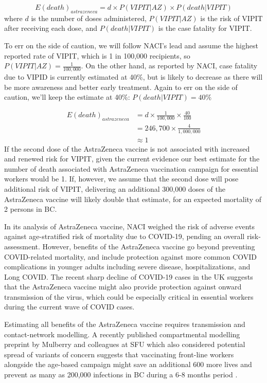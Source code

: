 \documentclass[]{interact}
\theoremstyle{plain}%
\theoremstyle{definition}
\theoremstyle{remark}
\begin{document}
\[
E(death)_{astrazeneca}  = d \times P(VIPIT|AZ) \times P(death|VIPIT)
\] where \(d\) is the number of doses administered, \(P(VIPIT|AZ)\) is
the risk of VIPIT after receiving each dose, and \(P(death|VIPIT)\) is
the case fatality for VIPIT.

To err on the side of caution, we will follow NACI's lead and assume the
highest reported rate of VIPIT, which is 1 in 100,000 recipients, so
\(P(VIPIT|AZ) = \frac{1}{100,000}\). On the other hand, as reported by
NACI, case fatality due to VIPID is currently estimated at 40\%, but is
likely to decrease as there will be more awareness and better early
treatment. Again to err on the side of caution, we'll keep the estimate
at 40\%: \(P(death|VIPIT)=40\%\)

\[
\begin{aligned}
E(death)_{astrazeneca} & = d \times \frac{1}{100,000} \times \frac{40}{100} \\
& = 246,700 \times \frac{4}{1,000,000} \\
& \approx 1  
\end{aligned}
\] If the second dose of the AstraZeneca vaccine is not associated with
increased and renewed risk for VIPIT, given the current evidence our
best estimate for the number of death associated with AstraZeneca
vaccination campaign for essential workers would be 1. If, however, we
assume that the second dose will pose additional risk of VIPIT,
delivering an additional 300,000 doses of the AstraZeneca vaccine will
likely double that estimate, for an expected mortality of 2 persons in
BC.

In its analysis of AstraZeneca vaccine, NACI weighed the risk of adverse
events against age-stratified risk of mortality due to COVID-19, pending
an overall risk-assessment. However, benefits of the AstraZeneca vaccine
go beyond preventing COVID-related mortality, and include protection
against more common COVID complications in younger adults including
severe disease, hospitalizations, and Long COVID. The recent sharp
decline of COVID-19 cases in the UK suggests that the AstraZeneca
vaccine might also provide protection against onward transmission of the
virus, which could be especially critical in essential workers during
the current wave of COVID cases.

Estimating all benefits of the AstraZeneca vaccine requires transmission
and contact-network modelling. A recently published compartmental
modelling preprint by Mulberry and colleagues at SFU which also
considered potential spread of variants of concern suggests that
vaccinating front-line workers alongside the age-based campaign might
save an additional 600 more lives and prevent as many as 200,000
infections in BC during a 6-8 months period
\citep{mulberry_vaccine_2021}.
\end{document}
